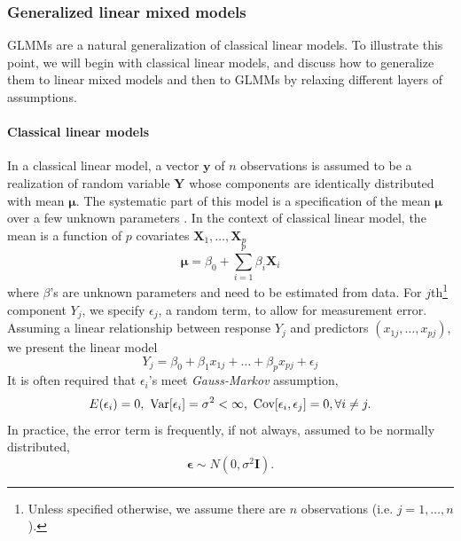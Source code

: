 \subsubsection{Generalized linear mixed models}\label{subsubsec:intro-stat-framework}
GLMMs are a natural generalization of classical linear models. To illustrate this point, we will
begin with classical linear models, and discuss how to generalize them to linear mixed models and
then to GLMMs by relaxing different layers of assumptions. 
\paragraph{Classical linear models}\label{para:clm}
In a classical linear model, a vector $\bm y$ of $n$ observations is assumed to be a realization
of random variable $\bm Y$ whose components are identically distributed with mean $\bm \mu$. The
systematic part of this model is a specification of the mean $\bm\mu$ over a few unknown parameters
\citep{mccullagh1989generalized}. In the context of classical linear model, the mean is a function
of $p$ covariates $\bm X_1, \ldots, \bm X_p$
\begin{equation}\label{eq:clm}
	\bm \mu =\beta_0 + \sum_{i=1}^p\beta_i \bm X_i
\end{equation}	
where $\beta$'s are unknown parameters and need to be estimated from data. For
$j$th\footnote{Unless specified otherwise, we assume there are $n$ observations (i.e. $j=1, \ldots
	,n$).} component $Y_j$, we specify $\epsilon_j$, a random term, to allow for measurement error.
Assuming a linear relationship between response $Y_j$ and predictors $(x_{1j}, \ldots, x_{pj})$, we
present the linear model 
\begin{equation}\label{eq:clm2}
	Y_j= \beta_0 + \beta_1x_{1j} + \ldots + \beta_p x_{pj} + \epsilon_j
\end{equation}
It is often required that $\epsilon_i$'s meet \textit{Gauss-Markov} assumption,
\begin{equation}\label{eq:gauss-markov}
	E(\epsilon_i)=0,~ \text{Var}[\epsilon_i]=
	\sigma^2<\infty, ~\text{Cov}[\epsilon_i, \epsilon_j]=0, \forall i \neq j.
\end{equation}
In practice, the error term is frequently, if not always, assumed to be normally distributed, 
\begin{equation}\label{eq:normalassumption}
	\bm \epsilon \sim N(0, \sigma^2 \bm I).
\end{equation}

